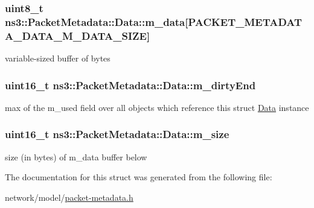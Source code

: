 \subsubsection[{\texorpdfstring{m\+\_\+data}{m_data}}]{\setlength{\rightskip}{0pt plus 5cm}uint8\+\_\+t ns3\+::\+Packet\+Metadata\+::\+Data\+::m\+\_\+data\mbox{[}{\bf P\+A\+C\+K\+E\+T\+\_\+\+M\+E\+T\+A\+D\+A\+T\+A\+\_\+\+D\+A\+T\+A\+\_\+\+M\+\_\+\+D\+A\+T\+A\+\_\+\+S\+I\+ZE}\mbox{]}}\hypertarget{structns3_1_1PacketMetadata_1_1Data_a98540e1e160a9c59048d4cf615b8e2a2}{}\label{structns3_1_1PacketMetadata_1_1Data_a98540e1e160a9c59048d4cf615b8e2a2}
variable-\/sized buffer of bytes 
\subsubsection[{\texorpdfstring{m\+\_\+dirty\+End}{m_dirtyEnd}}]{\setlength{\rightskip}{0pt plus 5cm}uint16\+\_\+t ns3\+::\+Packet\+Metadata\+::\+Data\+::m\+\_\+dirty\+End}\hypertarget{structns3_1_1PacketMetadata_1_1Data_ae98316cc438fb40663c2f848746d8935}{}\label{structns3_1_1PacketMetadata_1_1Data_ae98316cc438fb40663c2f848746d8935}
max of the m\+\_\+used field over all objects which reference this struct \hyperlink{structns3_1_1PacketMetadata_1_1Data}{Data} instance 
\subsubsection[{\texorpdfstring{m\+\_\+size}{m_size}}]{\setlength{\rightskip}{0pt plus 5cm}uint16\+\_\+t ns3\+::\+Packet\+Metadata\+::\+Data\+::m\+\_\+size}\hypertarget{structns3_1_1PacketMetadata_1_1Data_a1064e5617aec301dd4f28fb86c105848}{}\label{structns3_1_1PacketMetadata_1_1Data_a1064e5617aec301dd4f28fb86c105848}
size (in bytes) of m\+\_\+data buffer below 

The documentation for this struct was generated from the following file\+:\begin{DoxyCompactItemize}
\item 
network/model/\hyperlink{packet-metadata_8h}{packet-\/metadata.\+h}\end{DoxyCompactItemize}
